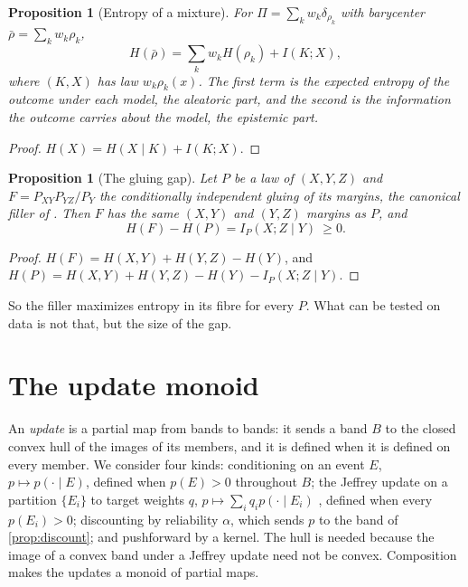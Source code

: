 \documentclass[11pt]{article}
\newtheorem{proposition}[theorem]{Proposition}
\theoremstyle{definition}
\theoremstyle{remark}
\begin{document}
\begin{proposition}[Entropy of a mixture]\label{prop:level2}
For $\Pi=\sum_kw_k\delta_{\rho_k}$ with barycenter $\bar\rho=\sum_kw_k\rho_k$,
\[
H(\bar\rho)=\sum_kw_kH(\rho_k)+I(K;X),
\]
where $(K,X)$ has law $w_k\rho_k(x)$. The first term is the expected entropy of the outcome under each model, the aleatoric
part, and the second is the information the outcome carries about the model, the epistemic part.
\end{proposition}
\begin{proof}
$H(X)=H(X\mid K)+I(K;X)$.
\end{proof}

\begin{proposition}[The gluing gap]\label{prop:gluinggap}
Let $P$ be a law of $(X,Y,Z)$ and $F=P_{XY}P_{YZ}/P_Y$ the conditionally independent gluing of its margins, the canonical filler
of \cite[Thm.~4.2]{Conditionals}. Then $F$ has the same $(X,Y)$ and $(Y,Z)$ margins as $P$, and
\[
H(F)-H(P)=I_P(X;Z\mid Y)\ \ge0 .
\]
\end{proposition}
\begin{proof}
$H(F)=H(X,Y)+H(Y,Z)-H(Y)$, and $H(P)=H(X,Y)+H(Y,Z)-H(Y)-I_P(X;Z\mid Y)$.
\end{proof}

So the filler maximizes entropy in its fibre for every $P$. What can be tested on data is not that, but the size of the gap.

\section{The update monoid}\label{sec:monoid}

An \emph{update} is a partial map from bands to bands: it sends a band $B$ to the closed convex hull of the images of its
members, and it is defined when it is defined on every member. We consider four kinds: conditioning on an event $E$,
$p\mapsto p(\cdot\mid E)$, defined when $p(E)>0$ throughout $B$; the Jeffrey update on a partition $\{E_i\}$ to target weights
$q$, $p\mapsto\sum_iq_ip(\cdot\mid E_i)$ \cite{DiaconisZabell1982}, defined when every $p(E_i)>0$; discounting by reliability
$\alpha$, which sends $p$ to the band of \cref{prop:discount}; and pushforward by a kernel. The hull is needed because the image
of a convex band under a Jeffrey update need not be convex. Composition makes the updates a monoid of partial maps.
\end{document}
